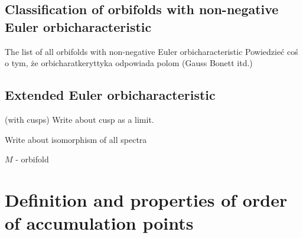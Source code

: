 \subsection{Classification of orbifolds with non-negative Euler orbicharacteristic}
The list of all orbifolds with non-negative Euler orbicharacteristic
Powiedzieć coś o tym, że orbicharatkeryttyka odpowiada polom (Gauss Bonett itd.)
\subsection{Extended Euler orbicharacteristic}\label{extended_Euler_orbicharacteristic} (with cusps)
Write about cusp as a limit.

Write about isomorphism of all spectra

$M$ - orbifold

\section{Definition and properties of order of accumulation points}
\label{accumulation_points_definitions} 

